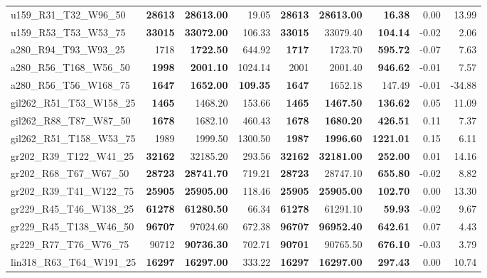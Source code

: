 \documentclass{singlecol-new}
\begin{document}
\begin{scriptsize}
\begin{longtable}{lrrrrrrrr}
		u159\_R31\_T32\_W96\_50 & \textbf{28613} & \textbf{28613.00} & 19.05 & \textbf{28613} & \textbf{28613.00} & \textbf{16.38} & 0.00 & 13.99 \\
		u159\_R53\_T53\_W53\_75 & \textbf{33015} & \textbf{33072.00} & 106.33 & \textbf{33015} & 33079.40 & \textbf{104.14} & -0.02 & 2.06 \\
		a280\_R94\_T93\_W93\_25 & 1718 & \textbf{1722.50} & 644.92 & \textbf{1717} & 1723.70 & \textbf{595.72} & -0.07 & 7.63 \\
		a280\_R56\_T168\_W56\_50 & \textbf{1998} & \textbf{2001.10} & 1024.14 & 2001 & 2001.40 & \textbf{946.62} & -0.01 & 7.57 \\
		a280\_R56\_T56\_W168\_75 & \textbf{1647} & \textbf{1652.00} & \textbf{109.35} & \textbf{1647} & 1652.18 & 147.49 & -0.01 & -34.88 \\
		gil262\_R51\_T53\_W158\_25 & \textbf{1465} & 1468.20 & 153.66 & \textbf{1465} & \textbf{1467.50} & \textbf{136.62} & 0.05 & 11.09 \\
		gil262\_R88\_T87\_W87\_50 & \textbf{1678} & 1682.10 & 460.43 & \textbf{1678} & \textbf{1680.20} & \textbf{426.51} & 0.11 & 7.37 \\
		gil262\_R51\_T158\_W53\_75 & 1989 & 1999.50 & 1300.50 & \textbf{1987} & \textbf{1996.60} & \textbf{1221.01} & 0.15 & 6.11 \\
		gr202\_R39\_T122\_W41\_25 & \textbf{32162} & 32185.20 & 293.56 & \textbf{32162} & \textbf{32181.00} & \textbf{252.00} & 0.01 & 14.16 \\
		gr202\_R68\_T67\_W67\_50 & \textbf{28723} & \textbf{28741.70} & 719.21 & \textbf{28723} & 28747.10 & \textbf{655.80} & -0.02 & 8.82 \\
		gr202\_R39\_T41\_W122\_75 & \textbf{25905} & \textbf{25905.00} & 118.46 & \textbf{25905} & \textbf{25905.00} & \textbf{102.70} & 0.00 & 13.30 \\
		gr229\_R45\_T46\_W138\_25 & \textbf{61278} & \textbf{61280.50} & 66.34 & \textbf{61278} & 61291.10 & \textbf{59.93} & -0.02 & 9.67 \\
		gr229\_R45\_T138\_W46\_50 & \textbf{96707} & 97024.60 & 672.38 & \textbf{96707} & \textbf{96952.40} & \textbf{642.61} & 0.07 & 4.43 \\
		gr229\_R77\_T76\_W76\_75 & 90712 & \textbf{90736.30} & 702.71 & \textbf{90701} & 90765.50 & \textbf{676.10} & -0.03 & 3.79 \\
		lin318\_R63\_T64\_W191\_25 & \textbf{16297} & \textbf{16297.00} & 333.22 & \textbf{16297} & \textbf{16297.00} & \textbf{297.43} & 0.00 & 10.74 \\

\end{longtable}
\end{scriptsize}
\end{document}

